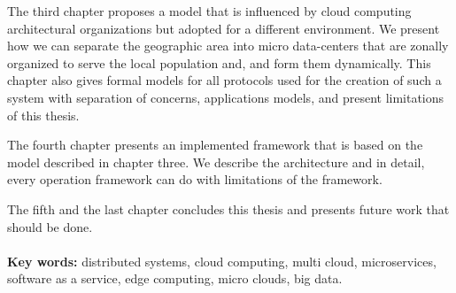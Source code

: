 The third chapter proposes a model that is influenced by cloud computing architectural organizations but adopted for a different environment. We present how we can separate the geographic area into micro data-centers that are zonally organized to serve the local population and, and form them dynamically. This chapter also gives formal models for all protocols used for the creation of such a system with separation of concerns, applications models, and present limitations of this thesis.

The fourth chapter presents an implemented framework that is based on the model described in chapter three. We describe the architecture and in detail, every operation framework can do with limitations of the framework.

The fifth and the last chapter concludes this thesis and presents future work that should be done.\\\\ 

\noindent
\textbf{Key words:} distributed systems, cloud computing, multi cloud, microservices, software as a service, edge computing, micro clouds, big data.